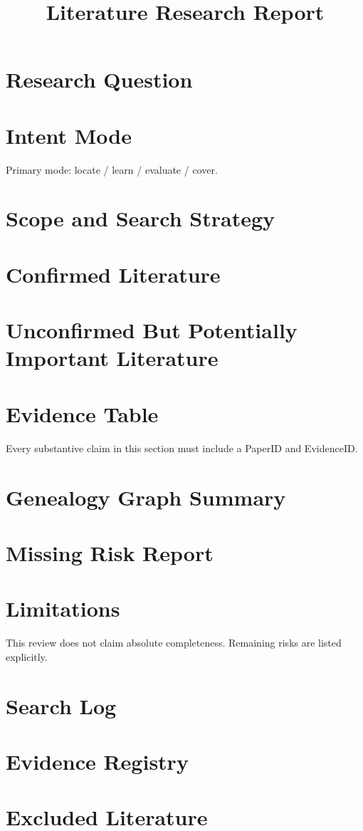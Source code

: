 \documentclass[11pt]{article}
\title{Literature Research Report}
\author{}
\date{}
\begin{document}
\maketitle

\section{Research Question}

\section{Intent Mode}

Primary mode: locate / learn / evaluate / cover.

\section{Scope and Search Strategy}

\section{Confirmed Literature}

\section{Unconfirmed But Potentially Important Literature}

\section{Evidence Table}

Every substantive claim in this section must include a PaperID and EvidenceID.

\section{Genealogy Graph Summary}

\section{Missing Risk Report}

\section{Limitations}

This review does not claim absolute completeness. Remaining risks are listed
explicitly.

\appendix

\section{Search Log}

\section{Evidence Registry}

\section{Excluded Literature}



\end{document}
